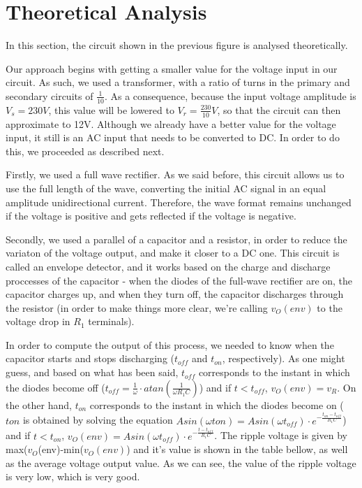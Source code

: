 \section{Theoretical Analysis}
\label{sec:theoretical}

\par In this section, the circuit shown in the previous figure is analysed theoretically.
\par Our approach begins with getting a smaller value for the voltage input in our circuit. As such, we used a transformer, with a ratio of turns in the primary and secondary circuits of $\frac{1}{10}$. As a consequence, because the input voltage amplitude is $V_s=230V$, this value will be lowered to $V_r=\frac{230}{10}V$, so that the circuit can then approximate to 12V. Although we already have a better value for the voltage input, it still is an AC input that needs to be converted to DC. In order to do this, we proceeded as described next.
\par Firstly, we used a full wave rectifier. As we said before, this circuit allows us to use the full length of the wave, converting the initial AC signal in an equal amplitude unidirectional current. Therefore, the wave format remains unchanged if the voltage is positive and gets reflected if the voltage is negative.
\par Secondly, we used a parallel of a capacitor and a resistor, in order to reduce the variaton of the voltage output, and make it closer to a DC one. This circuit is called an envelope detector, and it works based on the charge and discharge proccesses of the capacitor - when the diodes of the full-wave rectifier are on, the capacitor charges up, and when they turn off, the capacitor discharges through the resistor (in order to make things more clear, we're calling $v_O(env)$ to the voltage drop in $R_1$ terminals).
\par In order to compute the output of this process, we needed to know when the capacitor starts and stops discharging ($t_{off}$ and $t_{on}$, respectively). As one might guess, and based on what has been said, $t_{off}$ corresponds to the instant in which the diodes become off ($t_{off}=\frac{1}{\omega} \cdot atan(\frac{1}{\omega R_1C})$) and if $t<t_{off}$, $v_O(env)=v_R$. On the other hand, $t_{on}$ corresponds to the instant in which the diodes become on ($t{on}$ is obtained by solving the equation $Asin(\omega t{on})=Asin(\omega t_{off}) \cdot e^{-\frac{t_{on}-t_{off}}{R_1C}}$) and if $t<t_{on}$, $v_O(env)=Asin(\omega t_{off}) \cdot e^{-\frac{t-t_{off}}{R_1C}}$. The ripple voltage is given by max($v_O$(env)-min($v_O(env)$) and it's value is shown in the table bellow, as well as the average voltage output value. As we can see, the value of the ripple voltage is very low, which is very good. 

